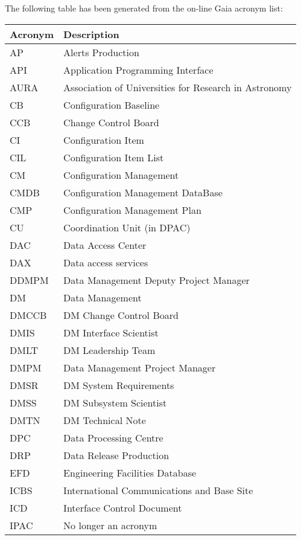 The following table has been generated from the on-line Gaia acronym list:
\newline\newline%
\addtocounter{table}{-1}
\begin{longtable}{|l|p{}|}\hline
\textbf{Acronym} & \textbf{Description}  \\\hline
AP&Alerts Production \\\hline
API&Application Programming Interface \\\hline
AURA&Association of Universities for Research in Astronomy \\\hline
CB&Configuration Baseline \\\hline
CCB&Change Control Board \\\hline
CI&Configuration Item \\\hline
CIL&Configuration Item List \\\hline
CM&Configuration Management \\\hline
CMDB&Configuration Management DataBase \\\hline
CMP&Configuration Management Plan \\\hline
CU&Coordination Unit (in DPAC) \\\hline
DAC&Data Access Center \\\hline
DAX&Data access services \\\hline
DDMPM&Data Management Deputy Project Manager \\\hline
DM&Data Management \\\hline
DMCCB&DM Change Control Board \\\hline
DMIS&DM Interface Scientist \\\hline
DMLT&DM Leadership Team \\\hline
DMPM&Data Management Project Manager \\\hline
DMSR&DM System Requirements \\\hline
DMSS&DM Subsystem Scientist \\\hline
DMTN&DM Technical Note \\\hline
DPC&Data Processing Centre \\\hline
DRP&Data Release Production \\\hline
EFD&Engineering Facilities Database \\\hline
ICBS&International Communications and Base Site \\\hline
ICD&Interface Control Document \\\hline
IPAC&No longer an acronym \\\hline

\end{longtable}
